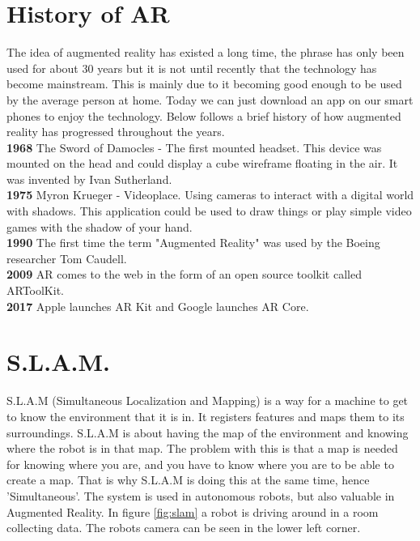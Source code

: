 \section{History of AR}
\label{sec:ARhistory}
The idea of augmented reality has existed a long time, the phrase has only been used for about 30 years but it is not until recently that the technology has become mainstream.
This is mainly due to it becoming good enough to be used by the average person at home. Today we can just download an app on our smart phones to enjoy the technology. Below follows a brief history of how augmented reality has progressed throughout the years.\\

\textbf{1968}
The Sword of Damocles - The first mounted headset.
This device was mounted on the head and could display a cube wireframe floating in the air. It was invented by Ivan Sutherland.\\

\textbf{1975}
Myron Krueger - Videoplace. Using cameras to interact with a digital world with shadows.
This application could be used to draw things or play simple video games with the shadow of your hand.
\cite{videoplace}\\

\textbf{1990}
The first time the term "Augmented Reality" was used by the Boeing researcher Tom Caudell.\\

\textbf{2009}
AR comes to the web in the form of an open source toolkit called ARToolKit.\\

\textbf{2017}
Apple launches AR Kit and Google launches AR Core.\\

\section{S.L.A.M.}
\label{sec:ARslam}
S.L.A.M (Simultaneous Localization and Mapping) is a way for a machine to get to know the environment that it is in. It registers features and maps them to its surroundings. S.L.A.M is about having the map of the environment and knowing where the robot is in that map.
The problem with this is that a map is needed for knowing where you are, and you have to know where you are to be able to create a map. That is why S.L.A.M is doing this at the same time, hence 'Simultaneous'. The system is used in autonomous robots, but also valuable in Augmented Reality. \cite{slam}
In figure \ref{fig:slam} a robot is driving around in a room collecting data. The robots camera can be seen in the lower left corner.


